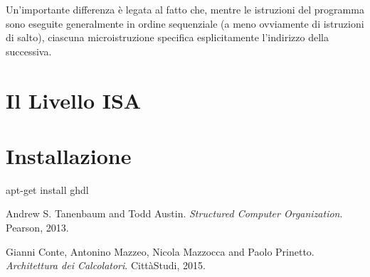 \documentclass[a4paper,12pt]{scrreprt}
\begin{document}
Un'importante differenza è legata al fatto che, mentre le istruzioni del
programma sono eseguite generalmente in ordine sequenziale (a meno ovviamente di
istruzioni di salto), ciascuna microistruzione specifica esplicitamente
l'indirizzo della successiva.

\chapter{Il Livello ISA}

\chapter{Installazione}

\begin{commandshell}
  apt-get install ghdl
\end{commandshell}

\begin{thebibliography}{2}
  Andrew S. Tanenbaum and Todd Austin.
  \textit{Structured Computer Organization}.
  Pearson, 2013.

  Gianni Conte, Antonino Mazzeo, Nicola Mazzocca and Paolo Prinetto.
  \textit{Architettura dei Calcolatori}.
  CittàStudi, 2015.
\end{thebibliography}
\end{document}
